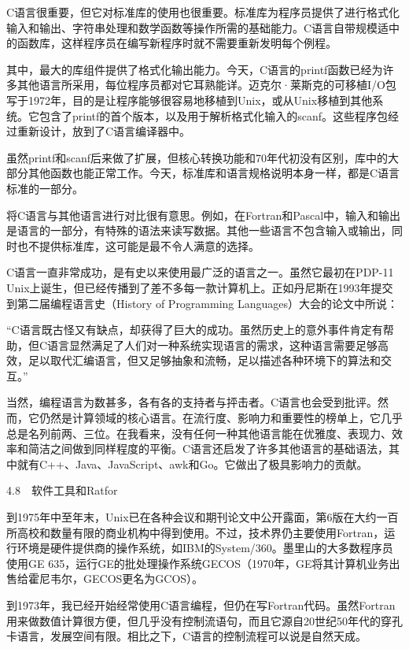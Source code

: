 \documentclass[a4paper,12pt,UTF8,twoside]{ctexbook}
\begin{document}
{C语言很重要，但它对标准库的使用也很重要。标准库为程序员提供了进行格式化输入和输出、字符串处理和数学函数等操作所需的基础能力。C语言自带规模适中的函数库，这样程序员在编写新程序时就不需要重新发明每个例程。

其中，最大的库组件提供了格式化输出能力。今天，C语言的printf函数已经为许多其他语言所采用，每位程序员都对它耳熟能详。迈克尔·莱斯克的可移植I/O包写于1972年，目的是让程序能够很容易地移植到Unix，或从Unix移植到其他系统。它包含了printf的首个版本，以及用于解析格式化输入的scanf。这些程序包经过重新设计，放到了C语言编译器中。

虽然printf和scanf后来做了扩展，但核心转换功能和70年代初没有区别，库中的大部分其他函数也能正常工作。今天，标准库和语言规格说明本身一样，都是C语言标准的一部分。

将C语言与其他语言进行对比很有意思。例如，在Fortran和Pascal中，输入和输出是语言的一部分，有特殊的语法来读写数据。其他一些语言不包含输入或输出，同时也不提供标准库，这可能是最不令人满意的选择。

C语言一直非常成功，是有史以来使用最广泛的语言之一。虽然它最初在PDP-11 Unix上诞生，但已经传播到了差不多每一款计算机上。正如丹尼斯在1993年提交到第二届编程语言史（History of Programming Languages）大会的论文中所说：

“C语言既古怪又有缺点，却获得了巨大的成功。虽然历史上的意外事件肯定有帮助，但C语言显然满足了人们对一种系统实现语言的需求，这种语言需要足够高效，足以取代汇编语言，但又足够抽象和流畅，足以描述各种环境下的算法和交互。”



当然，编程语言为数甚多，各有各的支持者与抨击者。C语言也会受到批评。然而，它仍然是计算领域的核心语言。在流行度、影响力和重要性的榜单上，它几乎总是名列前两、三位。在我看来，没有任何一种其他语言能在优雅度、表现力、效率和简洁之间做到同样程度的平衡。C语言还启发了许多其他语言的基础语法，其中就有C++、Java、JavaScript、awk和Go。它做出了极具影响力的贡献。





4.8　软件工具和Ratfor


到1975年中至年末，Unix已在各种会议和期刊论文中公开露面，第6版在大约一百所高校和数量有限的商业机构中得到使用。不过，技术界仍主要使用Fortran，运行环境是硬件提供商的操作系统，如IBM的System/360。墨里山的大多数程序员使用GE 635，运行GE的批处理操作系统GECOS（1970年，GE将其计算机业务出售给霍尼韦尔，GECOS更名为GCOS）。

到1973年，我已经开始经常使用C语言编程，但仍在写Fortran代码。虽然Fortran用来做数值计算很方便，但几乎没有控制流语句，而且它源自20世纪50年代的穿孔卡语言，发展空间有限。相比之下，C语言的控制流程可以说是自然天成。

}
\end{document}
